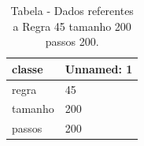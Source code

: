 \begin{table}[H]
\centering
\caption{Tabela - Dados referentes a Regra 45 tamanho 200 passos 200.}
\label{tab:regra_45_tamanho_200_passos_200}
\begin{tabular}{ll}
\toprule
classe & Unnamed: 1 \\
\midrule
regra & 45 \\
tamanho & 200 \\
passos & 200 \\
\bottomrule
\end{tabular}

\end{table}
